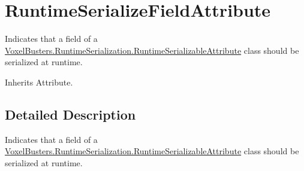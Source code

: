 \hypertarget{class_voxel_busters_1_1_runtime_serialization_1_1_runtime_serialize_field_attribute}{}\section{Runtime\+Serialize\+Field\+Attribute}
\label{class_voxel_busters_1_1_runtime_serialization_1_1_runtime_serialize_field_attribute}


Indicates that a field of a \hyperlink{class_voxel_busters_1_1_runtime_serialization_1_1_runtime_serializable_attribute}{Voxel\+Busters.\+Runtime\+Serialization.\+Runtime\+Serializable\+Attribute} class should be serialized at runtime.  




Inherits Attribute.



\subsection{Detailed Description}
Indicates that a field of a \hyperlink{class_voxel_busters_1_1_runtime_serialization_1_1_runtime_serializable_attribute}{Voxel\+Busters.\+Runtime\+Serialization.\+Runtime\+Serializable\+Attribute} class should be serialized at runtime. 

